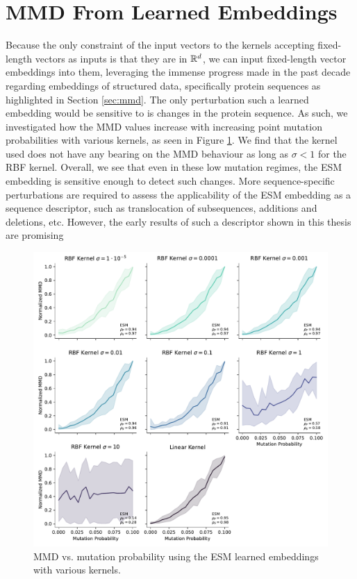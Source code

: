 \section{MMD From Learned Embeddings}

Because the only constraint of the input vectors to the kernels accepting
fixed-length vectors as inputs is that they are in $\mathbb{R}^d$, we can input
fixed-length vector embeddings into them, leveraging the immense progress made
in the past decade regarding embeddings of structured data, specifically protein
sequences as highlighted in Section \ref{sec:mmd}. The only perturbation such a
learned embedding would be sensitive to is changes in the protein sequence. As
such, we investigated how the MMD values increase with increasing point mutation
probabilities with various kernels, as seen in Figure \ref{fig:esm_descriptor}.
We find that the kernel used does not have any bearing on the MMD behaviour as
long as $\sigma<1$ for the RBF kernel. Overall, we see that even in these low
mutation regimes, the ESM embedding is sensitive enough to detect such changes.
More sequence-specific perturbations are required to assess the
applicability of the ESM embedding as a sequence descriptor, such as
translocation of subsequences, additions and deletions, etc. However, the early
results of such a descriptor shown in this thesis are promising

\begin{figure}
  \centering
  \includegraphics[width=\textwidth]{./figures/results/res_5.pdf}
  \caption[MMD vs. mutation probability using the ESM learned embeddings with
  various kernels ]{MMD vs. mutation probability using the ESM learned embeddings with various kernels.}
  \label{fig:esm_descriptor}
\end{figure}


